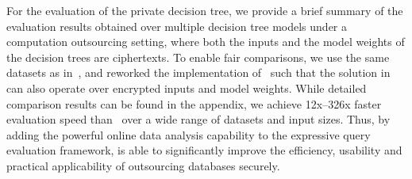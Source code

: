 
For the evaluation of the private decision tree, 
we provide a brief summary of the evaluation results obtained over
multiple decision tree models under a computation outsourcing setting, where both
the inputs and the model weights of the decision trees are ciphertexts.
To enable fair comparisons, we use the same datasets 
as in~\cite{sortinghat}, and reworked the implementation of~\cite{sortinghat} such that the
solution in~\cite{sortinghat} can also operate over encrypted inputs and model weights.
While detailed comparison results can be found in the appendix, we achieve 12x--326x faster 
evaluation speed than~\cite{sortinghat} over a wide range of datasets and input sizes.
Thus, by adding the powerful online data analysis
capability to the expressive query evaluation framework,
\NAME is able to significantly improve the efficiency, usability
and practical applicability of outsourcing databases securely.
